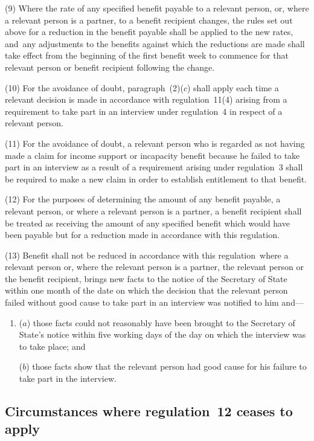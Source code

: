 \documentclass[12pt,a4paper]{article}
\begin{document}
(9) Where the rate of any specified benefit payable to a relevant person, or, where a relevant person is a partner, to a benefit recipient changes, the rules set out above for a reduction in the benefit payable shall be applied to the new rates, and~any adjustments to the benefits against which the reductions are made shall take effect from the beginning of the first benefit week to commence for that relevant person or benefit recipient following the change.

(10) For the avoidance of doubt, paragraph~(2)($c$)  shall apply each time a relevant decision is made in accordance with regulation~11(4) arising from a requirement to take part in an interview under regulation~4 in respect of a relevant person.

(11) For the avoidance of doubt, a relevant person who is regarded as not having made a claim for income support or incapacity benefit because he failed to take part in an interview as a result of a requirement arising under regulation~3 shall be required to make a new claim in order to establish entitlement to that benefit.

(12) For the purposes of determining the amount of any benefit payable, a relevant person, or where a relevant person is a partner, a benefit recipient shall be treated as receiving the amount of any specified benefit which would have been payable but for a reduction made in accordance with this regulation.

(13) Benefit shall not be reduced in accordance with this regulation~where a relevant person or, where the relevant person is a partner, the relevant person or the benefit recipient, brings new facts to the notice of the Secretary of State within one month of the date on which the decision that the relevant person failed without good cause to take part in an interview was notified to him and—
\begin{enumerate}\item[]
($a$) those facts could not reasonably have been brought to the Secretary of State’s notice within five working days of the day on which the interview was to take place; and

($b$) those facts show that the relevant person had good cause for his failure to take part in the interview.
\end{enumerate}

\subsection[13. Circumstances where regulation~12 ceases to apply]{Circumstances where regulation~12 ceases to apply}
\end{document}
